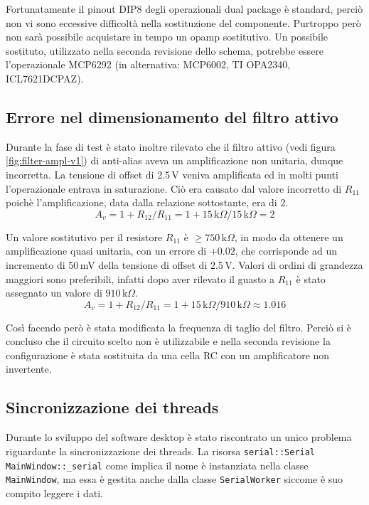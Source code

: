 Fortunatamente il pinout DIP8 degli operazionali dual package \`e standard,
perci\`o non vi sono eccessive difficolt\`a nella sostituzione del componente.
Purtroppo per\`o non sar\`a possibile acquistare in tempo un opamp
sostitutivo. Un possibile sostituto, utilizzato nella seconda revisione dello
schema, potrebbe essere l'operazionale MCP6292 (in alternativa: MCP6002, TI
OPA2340, ICL7621DCPAZ).

\subsection{Errore nel dimensionamento del filtro attivo}
\label{sec:err-filter}

Durante la fase di test \`e stato inoltre rilevato che il filtro attivo (vedi
figura \ref{fig:filter-ampl-v1}) di anti-alias aveva un amplificazione non
unitaria, dunque incorretta.  La tensione di offset di 2.5\,V veniva
amplificata ed in molti punti l'operazionale entrava in saturazione.  Ci\`o
era causato dal valore incorretto di \(R_{11}\) poich\`e l'amplificazione,
data dalla relazione sottostante, era  di 2.
\[
    A_v = 1+R_{12}/R_{11} = 1+15\,\text{k}\Omega/15\,\text{k}\Omega = 2
\]

Un valore sostitutivo per il resistore \(R_{11}\) \`e
\(\geq 750\,\text{k}\Omega\), in modo da ottenere un amplificazione quasi
unitaria, con un errore di \(+0.02\), che corrisponde ad un incremento di
50\,mV della tensione di offset di 2.5\,V. Valori di ordini di grandezza
maggiori sono preferibili, infatti dopo aver rilevato il guasto a \(R_{11}\)
\`e stato assegnato un valore di \(910\,\text{k}\Omega\).
\[
    A_v = 1+R_{12}/R_{11} = 1+15\,\text{k}\Omega/910\,\text{k}\Omega \approx 1.016
\]

Cos\`i facendo per\`o \`e stata modificata la frequenza di taglio del filtro.
Perci\`o si \`e concluso che il circuito scelto non \`e utilizzabile e nella
seconda revisione la configurazione \`e stata sostituita da una cella RC con
un amplificatore non invertente.

\subsection{Sincronizzazione dei threads}
\label{sec:err-sync}
Durante lo sviluppo del software desktop \`e stato riscontrato un unico
problema riguardante la sincronizzazione dei threads. La risorsa
\texttt{serial::Serial MainWindow::\_serial}  come implica il nome \`e
instanziata nella classe \texttt{MainWindow}, ma essa \`e gestita anche dalla
classe \texttt{SerialWorker} siccome \`e suo compito leggere i dati.

